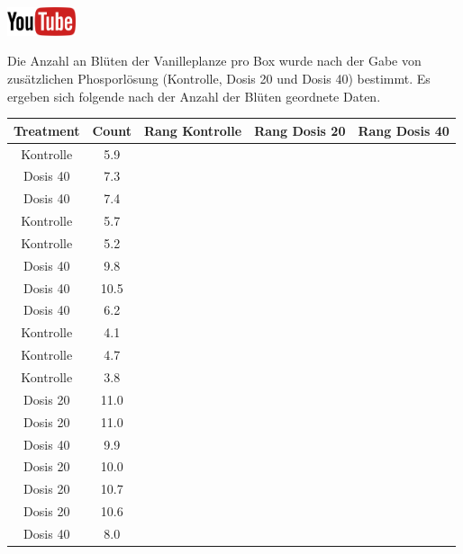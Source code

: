 \documentclass[a4paper, 9pt]{scrartcl}\usepackage[]{graphicx}\usepackage[]{xcolor}
\newenvironment{knitrout}{}{} %
\begin{document}
\hfill\href{https://youtu.be/gC0SXiIG2wQ}{\includegraphics[width =
  2cm]{img/youtube}} %
\hspace{2Ex}




Die Anzahl an Bl{\"u}ten der Vanilleplanze pro Box wurde nach der Gabe von
zus{\"a}tzlichen Phosporl{\"o}sung (Kontrolle, Dosis 20 und Dosis 40) bestimmt. Es
ergeben sich folgende nach der Anzahl der Bl{\"u}ten geordnete Daten.

\begin{knitrout}
\color{fgcolor}\begin{table}[!h]
\centering
\begin{tabular}{ccccc}
\toprule
Treatment & Count & Rang Kontrolle & Rang Dosis 20 & Rang Dosis 40\\
\midrule
Kontrolle & 5.9 &  &  & \\
Dosis 40 & 7.3 &  &  & \\
Dosis 40 & 7.4 &  &  & \\
Kontrolle & 5.7 &  &  & \\
Kontrolle & 5.2 &  &  & \\
\addlinespace
Dosis 40 & 9.8 &  &  & \\
Dosis 40 & 10.5 &  &  & \\
Dosis 40 & 6.2 &  &  & \\
Kontrolle & 4.1 &  &  & \\
Kontrolle & 4.7 &  &  & \\
\addlinespace
Kontrolle & 3.8 &  &  & \\
Dosis 20 & 11.0 &  &  & \\
Dosis 20 & 11.0 &  &  & \\
Dosis 40 & 9.9 &  &  & \\
Dosis 20 & 10.0 &  &  & \\
\addlinespace
Dosis 20 & 10.7 &  &  & \\
Dosis 20 & 10.6 &  &  & \\
Dosis 40 & 8.0 &  &  & \\
\bottomrule
\end{tabular}
\end{table}

\end{knitrout}
\end{document}

